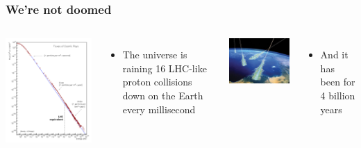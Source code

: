 \documentclass[compress]{beamer}
\begin{document}
\begin{frame}
\frametitle{We're not doomed}

\begin{columns}
\includegraphics[width=\linewidth]{cosmics_spectrum.png}

\begin{itemize}
\item The universe is raining 16 LHC-like proton collisions
  down on the Earth every millisecond
\end{itemize}

\includegraphics[width=\linewidth]{cosmic_ray_showers.jpg}
\begin{itemize}
\item And it has been for 4 billion years


\end{itemize}
\end{columns}
\end{frame}
\end{document}
